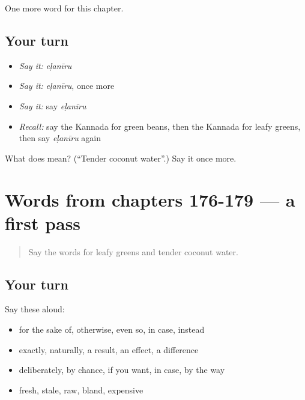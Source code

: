 \begin{grammarlens}[title={What you've built}]
One more word for this chapter.
\end{grammarlens}

\subsection*{Your turn}
\begin{itemize}
\raggedright
  \item \emph{Say it:} \emph{eḷanīru}
  \item \emph{Say it:} \emph{eḷanīru}, once more
  \item \emph{Say it:} say \emph{eḷanīru}
  \item \emph{Recall:} say the Kannada for green beans, then the Kannada for leafy greens, then say \emph{eḷanīru} again
\end{itemize}

\begin{tcolorbox}[breakable,colback=teal!4,colframe=teal!35!black,title={Before you move on}]
What does  mean? (\textquotedblleft{}Tender coconut water\textquotedblright{}.) Say it once more.
\end{tcolorbox}
\section[(dialogue)]{Words from chapters 176-179 — a first pass}

\label{lesson:KA-R184-first-pass-words-from-chapters-176-179}



\begin{quote}
Say the words for leafy greens and tender coconut water.
\end{quote}

\subsection*{Your turn}
Say these aloud:

\begin{itemize}
\raggedright
  \item for the sake of, otherwise, even so, in case, instead
  \item exactly, naturally, a result, an effect, a difference
  \item deliberately, by chance, if you want, in case, by the way
  \item fresh, stale, raw, bland, expensive
\end{itemize}


